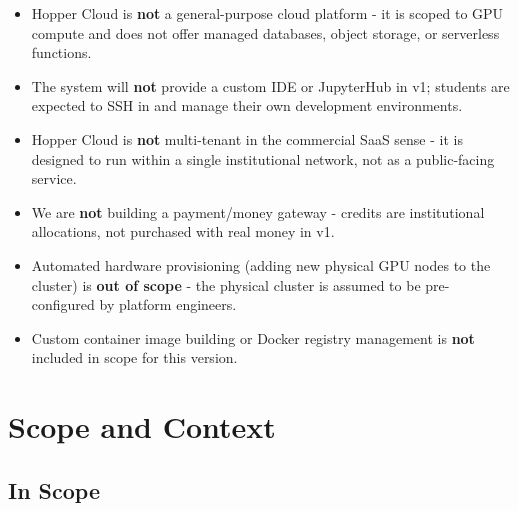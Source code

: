 \documentclass[12pt,a4paper]{article}
\begin{document}
\begin{itemize}[leftmargin=1.5em]
  \item Hopper Cloud is \textbf{not} a general-purpose cloud platform - it is scoped to GPU compute and does not offer managed databases, object storage, or serverless functions.
  \item The system will \textbf{not} provide a custom IDE or JupyterHub in v1; students are expected to SSH in and manage their own development environments.
  \item Hopper Cloud is \textbf{not} multi-tenant in the commercial SaaS sense - it is designed to run within a single institutional network, not as a public-facing service.
  \item We are \textbf{not} building a payment/money gateway - credits are institutional allocations, not purchased with real money in v1.
  \item Automated hardware provisioning (adding new physical GPU nodes to the cluster) is \textbf{out of scope} - the physical cluster is assumed to be pre-configured by platform engineers.
  \item Custom container image building or Docker registry management is \textbf{not} included in scope for this version.
\end{itemize}

\newpage
\section{Scope and Context}

\subsection{In Scope}
\end{document}
